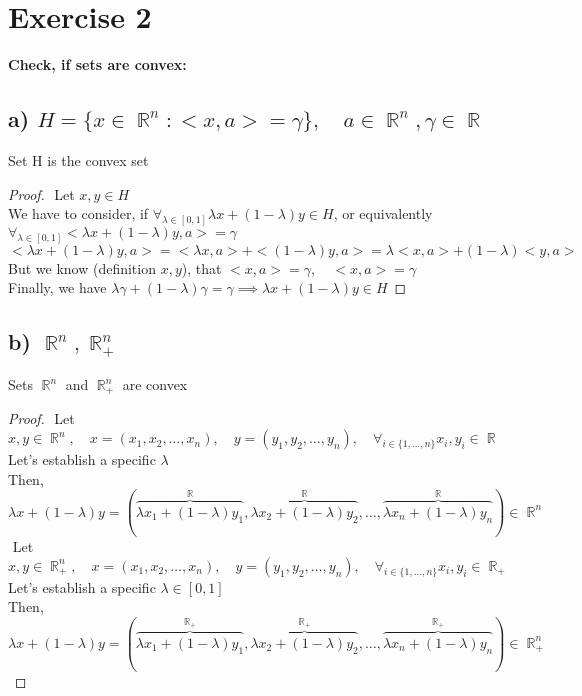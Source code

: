 \documentclass[12pt]{article}
\DeclareMathOperator{\R}{\mathbb{R}}
\begin{document}
\section*{Exercise 2}
{\bfseries Check, if sets are convex:}
\subsection*{a) \(H=\{x \in \R^n : <x,a> = \gamma \}, \quad a \in \R^n, \gamma \in \R\) }
Set H is the convex set
\begin{proof}
$ $\newline
Let \(x, y \in H\)\\
We have to consider, if \(\forall_{\lambda \in [0,1]} \lambda x+(1-\lambda)y \in H\), or equivalently \( \forall_{\lambda \in [0,1]} <\lambda x+(1-\lambda)y, a>=\gamma\)\\
\( <\lambda x+(1-\lambda)y, a>=<\lambda x, a>+<(1-\lambda)y, a>=\lambda<x, a>+(1-\lambda)<y, a> \)\\
But we know (definition \(x, y\)), that \( <x, a> =\gamma,\quad <x, a> =\gamma\)\\
Finally, we have \(\lambda\gamma+(1-\lambda)\gamma=\gamma \implies \lambda x+(1-\lambda)y \in H \)
\end{proof}
\subsection*{b) \(\R^n, \R^n_+\)}
Sets \(\R^n\) and \(\R^n_+\) are convex
\begin{proof}
$ $\newline
Let \(x, y \in \R^n,\quad x=(x_1, x_2, \ldots, x_n),\quad y=(y_1, y_2, \ldots, y_n), \quad \forall_{i \in \{1, \ldots, n \}}x_i, y_i \in \R\)\\
Let's establish a specific \(\lambda\)\\
Then, \( \lambda x+(1-\lambda)y = (\overbrace{\lambda x_1+(1-\lambda)y_1}^{\R},\overbrace{\lambda x_2+(1-\lambda)y_2}^{\R}, \ldots, \overbrace{\lambda x_n+(1-\lambda)y_n}^{\R}) \in \R^n\)\\
$ $\newline
Let \(x, y \in \R^n_+,\quad x=(x_1, x_2, \ldots, x_n),\quad y=(y_1, y_2, \ldots, y_n), \quad \forall_{i \in \{1, \ldots, n \}}x_i, y_i \in \R_+\)\\
Let's establish a specific \(\lambda \in [0,1]\)\\
Then, \( \lambda x+(1-\lambda)y = (\overbrace{\lambda x_1+(1-\lambda)y_1}^{\R_+},\overbrace{\lambda x_2+(1-\lambda)y_2}^{\R_+}, \ldots, \overbrace{\lambda x_n+(1-\lambda)y_n}^{\R_+}) \in \R^n_+\)\\
\end{proof}
\end{document}
